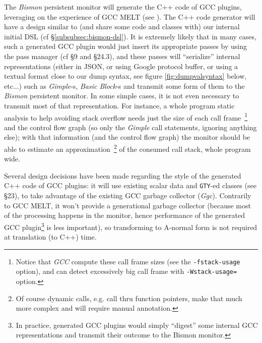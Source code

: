 The \emph{Bismon} persistent monitor will generate the C++ code of GCC
plugins, leveraging on the experience of GCC MELT (see
\cite{Starynkevitch-DSL2011,Starynkevitch2007Multistage,Starynkevitch-GCCMELTweb}). The
C++ code generator will have a design similar to (and share some code
and classes with) our internal initial DSL (cf
\S\ref{subsubsec:bismon-dsl}). It is extremely likely that in many
cases, such a generated GCC plugin would just insert its appropriate
passes by using the pass manager (cf \cite{gcc-internals} \S9 and
\S24.3), and these passes will ``serialize'' internal representations
(either in JSON, or using Google protocol buffer, or using a textual
format close to our dump syntax, see figure \ref{fig:dumpvalsyntax}
below, etc...)  such as \emph{Gimple}-s, \emph{Basic Block}-s and
transmit some form of them to the \emph{Bismon} persistent monitor. In
some simple cases, it is not even necessary to transmit most of that
representation. For instance, a whole program static analysis to help
avoiding stack overflow needs just the size of each call
frame~\footnote{Notice that \emph{GCC} compute these call frame sizes
  (see the \texttt{-fstack-usage} option), and can detect excessively
  big call frame with \texttt{-Wstack-usage=} option.} and the control
flow graph (so only the \emph{Gimple} call statements, ignoring
anything else); with that information (and the control flow graph)
the monitor should be able to estimate an approximation~\footnote{Of
  course dynamic calls, e.g. call thru function pointers, make that
  much more complex and will require manual annotation.} of the
consumed call stack, whole program wide.

Several design decisions have been made regarding the style of the
generated C++ code of GCC plugins: it will use existing scalar data
and \texttt{GTY}-ed classes (see \cite{gcc-internals} \S23), to take
advantage of the existing GCC garbage collector
(\emph{Ggc}). Contrarily to GCC MELT, it won't provide a generational
garbage collector (because most of the processing happens in the
monitor, hence performance of the generated GCC plugin\footnote{In
  practice, generated GCC plugins would simply ``digest'' some
  internal GCC representations and transmit their outcome to the
  Bismon monitor.} is less important), so transforming to A-normal
form is not required at translation (to C++) time.




